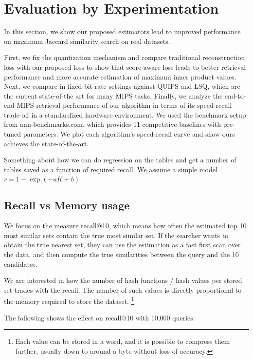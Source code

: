 
\section{Evaluation by Experimentation}\label{sec:evaluation}

In this section, we show our proposed estimators lead to improved performance on maximum
Jaccard similarity search on real datasets.

First, we fix the quantization
mechanism and compare traditional reconstruction
loss with our proposed loss to show that score-aware
loss leads to better retrieval performance and more accurate estimation of maximum inner product values.
Next, we compare in fixed-bit-rate settings against
QUIPS and LSQ, which are the current state-of-the art for many MIPS tasks. Finally, we analyze the
end-to-end MIPS retrieval performance of our algorithm in terms of its speed-recall trade-off in a
standardized hardware environment. We used the
benchmark setup from ann-benchmarks.com, which
provides 11 competitive baselines with pre-tuned parameters. We plot each algorithm’s speed-recall curve
and show ours achieves the state-of-the-art.

Something about how we can do regression on the tables and get a number of tables saved as a function of required recall.
We assume a simple model $r = 1-\exp(-aK+b)$

\subsection{Recall vs Memory usage}

We focus on the measure recall@10, which means how often the estimated top 10 most similar sets contain the true most similar set.
If the searcher wants to obtain the true nearest set, they can use the estimation as a fast first scan over the data, and then compute the true similarities between the query and the 10 candidates.

We are interested in how the number of hash functions / hash values per stored set trades with the recall.
The number of such values is directly proportional to the memory required to store the dataset.
\footnote{Each value can be stored in a word, and it is possible to compress them further, usually down to around a byte without loss of accuracy.}

The following shows the effect on recall@10 with 10,000 queries:

